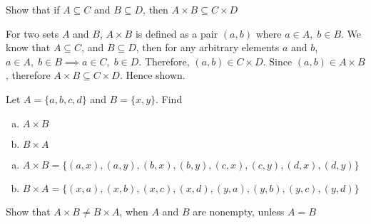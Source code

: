 \documentclass[addpoints]{exam}
\newenvironment{problem}[2][Problem]{\begin{trivlist}
\item[\hskip \labelsep {\bfseries #1}\hskip \labelsep {\bfseries #2.}]}{\end{trivlist}}
\begin{document}
\begin{sloppypar}
    \begin{problem}{6}[Chapter 2.1, Question 26]
    Show that if $A \subseteq C$ and $ B \subseteq D$, then $ A \times B \subseteq C \times D$
    \end{problem}

    \begin{questions}
        \question
        \begin{solution}
            
            For two sets $A$ and $B$, $ A \times B $ is defined as a pair $ (a, b) $ where $ a \in A,\; b \in B $. We know that $ A \subseteq C $, and $ B \subseteq D $, then for any arbitrary elements $ a $ and $ b $, $ a \in A, \; b \in B \implies a \in C, \; b \in D $. Therefore, $ (a, b) \in C \times D $. Since $ (a, b) \in A \times B $, therefore $ A \times B \subseteq C \times D $. Hence shown.
        \end{solution}
    \end{questions}

    \begin{problem}{7}[Chapter 2.1, Question 27]
    Let $A = \{a,b,c,d\}$ and $B = \{x,y\}$. Find
    \begin{enumerate}[(a)]
        \item $ A \times B$
        \item $ B \times A$
    \end{enumerate}
    \end{problem}

    \begin{questions}
        \question
        \begin{solution}
            
            \begin{enumerate}[(a)]
                \item $ A \times B = \{ (a, x), (a, y), (b, x), (b, y), (c, x), (c, y), (d, x), (d, y) \} $
                \item $ B \times A = \{ (x, a), (x, b), (x, c), (x, d), (y, a), (y, b), (y, c), (y, d) \} $
            \end{enumerate}
        \end{solution}
    \end{questions}
    \pagebreak
    \begin{problem}{8}[Chapter 2.1, Question 38]
    Show that $ A \times B \neq B \times A$, when $A$ and $B$ are nonempty, unless $ A = B$
    \end{problem}


\end{sloppypar}
\end{document}

